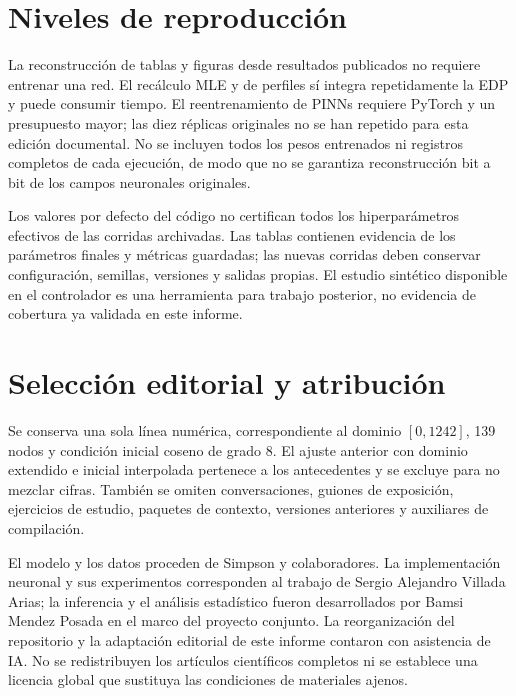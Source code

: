\documentclass[11pt,a4paper]{report}
\begin{document}
\section{Niveles de reproducción}
La reconstrucción de tablas y figuras desde resultados publicados no requiere entrenar una red. El recálculo MLE y de perfiles sí integra repetidamente la EDP y puede consumir tiempo. El reentrenamiento de PINNs requiere PyTorch y un presupuesto mayor; las diez réplicas originales no se han repetido para esta edición documental. No se incluyen todos los pesos entrenados ni registros completos de cada ejecución, de modo que no se garantiza reconstrucción bit a bit de los campos neuronales originales.

Los valores por defecto del código no certifican todos los hiperparámetros efectivos de las corridas archivadas. Las tablas contienen evidencia de los parámetros finales y métricas guardadas; las nuevas corridas deben conservar configuración, semillas, versiones y salidas propias. El estudio sintético disponible en el controlador es una herramienta para trabajo posterior, no evidencia de cobertura ya validada en este informe.

\section{Selección editorial y atribución}
Se conserva una sola línea numérica, correspondiente al dominio $[0,1242]$, 139 nodos y condición inicial coseno de grado 8. El ajuste anterior con dominio extendido e inicial interpolada pertenece a los antecedentes y se excluye para no mezclar cifras. También se omiten conversaciones, guiones de exposición, ejercicios de estudio, paquetes de contexto, versiones anteriores y auxiliares de compilación.

El modelo y los datos proceden de Simpson y colaboradores. La implementación neuronal y sus experimentos corresponden al trabajo de Sergio Alejandro Villada Arias; la inferencia y el análisis estadístico fueron desarrollados por Bamsi Mendez Posada en el marco del proyecto conjunto. La reorganización del repositorio y la adaptación editorial de este informe contaron con asistencia de IA. No se redistribuyen los artículos científicos completos ni se establece una licencia global que sustituya las condiciones de materiales ajenos.
\end{document}

